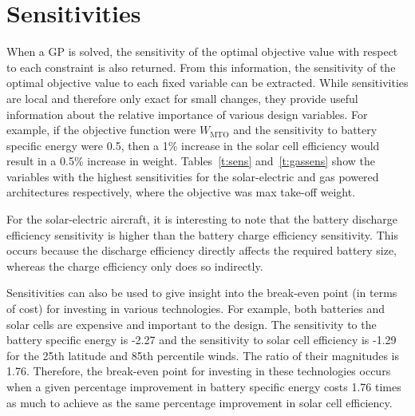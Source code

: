 \section{Sensitivities}

When a GP is solved, the sensitivity of the optimal objective value with respect to each constraint is also returned.  
From this information, the sensitivity of the optimal objective value to each fixed variable can be extracted.\cite{hoburgthesis} 
While sensitivities are local and therefore only exact for small changes, they provide useful information about the relative importance of various design variables. 
For example, if the objective function were $W_{\text{MTO}}$ and the sensitivity to battery specific energy were 0.5, then a 1\% increase in the solar cell efficiency would result in a 0.5\% increase in weight.  
Tables~\ref{t:sens} and~\ref{t:gassens} show the variables with the highest sensitivities for the solar-electric and gas powered architectures respectively, where the objective was max take-off weight.

For the solar-electric aircraft, it is interesting to note that the battery discharge efficiency sensitivity is higher than the battery charge efficiency sensitivity.
This occurs because the discharge efficiency directly affects the required battery size, whereas the charge efficiency only does so indirectly. 

Sensitivities can also be used to give insight into the break-even point (in terms of cost) for investing in various technologies.  
For example, both batteries and solar cells are expensive and important to the design.  
The sensitivity to the battery specific energy is -2.27 and the sensitivity to solar cell efficiency is -1.29 for the 25th latitude and 85th percentile winds. 
The ratio of their magnitudes is 1.76.  
Therefore, the break-even point for investing in these technologies occurs when a given percentage improvement in battery specific energy costs 1.76 times as much to achieve as the same percentage improvement in solar cell efficiency. 

\footnotesize




